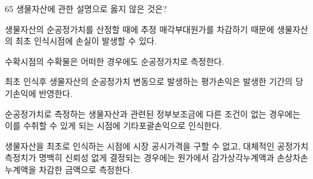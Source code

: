 \begin{question}{65}
생물자산에 관한 설명으로 옳지 않은 것은?
\begin{choices}
  \item 생물자산의 순공정가치를 산정할 때에 추정 매각부대원가를 차감하기 때문에 생물자산의 최초 인식시점에 손실이 발생할 수 있다.
  \item 수확시점의 수확물은 어떠한 경우에도 순공정가치로 측정한다.
  \item 최초 인식후 생물자산의 순공정가치 변동으로 발생하는 평가손익은 발생한 기간의 당기손익에 반영한다.
  \item 순공정가치로 측정하는 생물자산과 관련된 정부보조금에 다른 조건이 없는 경우에는 이를 수취할 수 있게 되는 시점에 기타포괄손익으로 인식한다.
  \item 생물자산을 최초로 인식하는 시점에 시장 공시가격을 구할 수 없고, 대체적인 공정가치측정치가 명백히 신뢰성 없게 결정되는 경우에는 원가에서 감가상각누계액과 손상차손누계액을 차감한 금액으로 측정한다.
\end{choices}
\end{question}
